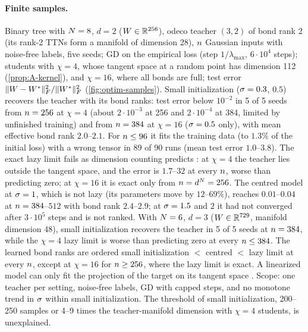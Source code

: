 \paragraph{Finite samples.}
\empirical{} \derived{} Binary tree with $N=8$, $d=2$ ($W\in\mathbb{R}^{256}$), odeco teacher $(3,2)$ of bond rank 2 (its rank-2
TTNs form a manifold of dimension 28), $n$ Gaussian inputs with noise-free labels, five seeds; GD on the empirical
loss (step $1/\lambda_{\max}$, $6\cdot10^4$ steps); students with $\chi=4$, whose tangent space at a random point has
dimension 112 (\cref{prop:A-kernel}), and $\chi=16$, where all bonds are full; test error
$\lVert W-W^{*}\rVert_{F}^2/\lVert W^{*}\rVert_{F}^2$ (\cref{fig:optim-samples}). Small initialization ($\sigma=0.3$, $0.5$) recovers the teacher
with its bond ranks: test error below $10^{-2}$ in 5 of 5 seeds from $n=256$ at $\chi=4$ (about $2\cdot10^{-3}$ at
256 and $2\cdot10^{-4}$ at 384, limited by unfinished training) and from $n=384$ at $\chi=16$ ($\sigma=0.5$ only), with
mean effective bond rank $2.0$--$2.1$. For $n\le96$ it fits the training data (to $1.3\%$ of the initial loss)
with a wrong tensor in 89 of 90 runs (mean test error $1.0$--$3.8$). The exact lazy limit fails as dimension counting
predicts \derived: at $\chi=4$ the teacher lies outside the tangent space, and the error is $1.7$--$32$ at every
$n$, worse than predicting zero; at $\chi=16$ it is exact only from $n=d^N=256$. The centred model at
$\sigma=1$, which is not lazy (its parameters move by $12$--$69\%$), reaches $0.01$--$0.04$ at $n=384$--$512$ with bond
rank $2.4$--$2.9$; at $\sigma=1.5$ and $2$ it had not converged after $3\cdot10^5$ steps and is not ranked. With $N=6$,
$d=3$ ($W\in\mathbb{R}^{729}$, manifold dimension 48), small initialization recovers the teacher in 5 of 5 seeds at
$n=384$, while the $\chi=4$ lazy limit is worse than predicting zero at every $n\le384$. The learned bond
ranks are ordered small initialization $<$ centred $<$ lazy limit at every $n$, except at $\chi=16$ for
$n\ge256$, where the lazy limit is exact. A linearized model can only fit the projection of the target on its
tangent space . Scope: one teacher per setting, noise-free labels, GD with capped steps, and no monotone trend in $\sigma$ within
small initialization. The threshold of small initialization, 200--250 samples or 4--9 times the teacher-manifold
dimension with $\chi=4$ students, is unexplained.

